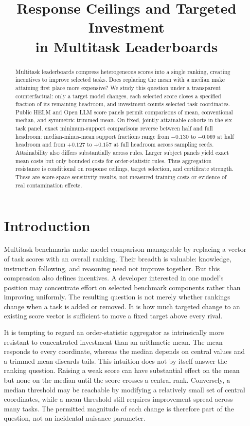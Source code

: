 \documentclass{article}
\title{Response Ceilings and Targeted Investment\\in Multitask Leaderboards}
\author{}
\begin{document}
\maketitle

\begin{abstract}
Multitask leaderboards compress heterogeneous scores into a single ranking, creating incentives to improve selected tasks. Does replacing the mean with a median make attaining first place more expensive? We study this question under a transparent counterfactual: only a target model changes, each selected score closes a specified fraction of its remaining headroom, and investment counts selected task coordinates. Public HELM and Open LLM score panels permit comparisons of mean, conventional median, and symmetric trimmed mean. On fixed, jointly attainable cohorts in the six-task panel, exact minimum-support comparisons reverse between half and full headroom: median-minus-mean support fractions range from $-0.130$ to $-0.069$ at half headroom and from $+0.127$ to $+0.157$ at full headroom across sampling seeds. Attainability also differs substantially across rules. Larger subject panels yield exact mean costs but only bounded costs for order-statistic rules. Thus aggregation resistance is conditional on response ceilings, target selection, and certificate strength. These are score-space sensitivity results, not measured training costs or evidence of real contamination effects.
\end{abstract}

\section{Introduction}
Multitask benchmarks make model comparison manageable by replacing a vector of task scores with an overall ranking. Their breadth is valuable: knowledge, instruction following, and reasoning need not improve together. But this compression also defines incentives. A developer interested in one model's position may concentrate effort on selected benchmark components rather than improving uniformly. The resulting question is not merely whether rankings change when a task is added or removed. It is how much targeted change to an existing score vector is sufficient to move a fixed target above every rival.

It is tempting to regard an order-statistic aggregator as intrinsically more resistant to concentrated investment than an arithmetic mean. The mean responds to every coordinate, whereas the median depends on central values and a trimmed mean discards tails. This intuition does not by itself answer the ranking question. Raising a weak score can have substantial effect on the mean but none on the median until the score crosses a central rank. Conversely, a median threshold may be reachable by modifying a relatively small set of central coordinates, while a mean threshold still requires improvement spread across many tasks. The permitted magnitude of each change is therefore part of the question, not an incidental nuisance parameter.
\end{document}
